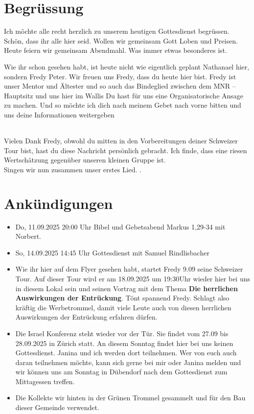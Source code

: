 \documentclass{../../inc/mybib}
\newenvironment{block}[1][]{%
  \vspace{1.5em}%
  \noindent\textbf{#1}\par%
  \vspace{0.0em}%
}{%
  \vspace{1em}%
}
\begin{document}
\section{Begrüssung}
Ich möchte alle recht herzlich zu unserem heutigen Gottesdienst begrüssen. Schön, dass ihr alle hier seid. Wollen wir gemeinsam Gott Loben und Preisen. Heute feiern wir gemeinsam Abendmahl. Was immer etwas besonderes ist. 
\begin{block}
Wie ihr schon gesehen habt, ist heute nicht wie eigentlich geplant Nathanael hier, sondern Fredy Peter. Wir freuen uns Fredy, dass du heute hier bist. Fredy ist unser Mentor und Ältester und so auch das Bindeglied zwischen dem MNR -- Hauptsitz und uns hier im Wallis Du hast für uns eine Organisatorische Ansage zu machen. Und so möchte ich dich nach meinem Gebet nach vorne bitten und uns deine Informationen weitergeben
\end{block}

\beten{}
\\

Vielen Dank Fredy, obwohl du mitten in den Vorbereitungen deiner Schweizer Tour bist, hast du diese Nachricht persönlich gebracht. Ich finde, dass eine riesen Wertschätzung gegenüber unseren kleinen Gruppe ist.\\

Singen wir nun zusammen unser erstes Lied.
{}.

\section{Ankündigungen}
\begin{itemize}
    \item {} Do, 11.09.2025 20:00 Uhr Bibel und Gebetsabend Markus 1,29-34 mit Norbert.
    \item {} So, 14.09.2025 14:45 Uhr Gottesdienst mit Samuel Rindlisbacher
    \item {} Wie ihr hier auf dem Flyer gesehen habt, startet Fredy 9.09 seine Schweizer Tour. Auf dieser Tour wird er am 18.09.2025 um 19:30Uhr wieder hier bei uns in diesem Lokal sein und seinen Vortrag mit dem Thema \textbf{Die herrlichen Auswirkungen der Entrückung}. Tönt spannend Fredy. Schlagt also kräftig die Werbetrommel, damit viele Leute auch von diesen herrlichen Auswirkungen der Entrückung erfahren dürfen.
    \item {} Die Israel Konferenz steht wieder vor der Tür. Sie findet vom 27.09 bis 28.09.2025 in Zürich statt. An diesem Sonntag findet hier bei uns keinen Gottesdienst. Janina und ich werden dort teilnehmen. Wer von euch auch daran teilnehmen möchte, kann sich gerne bei mir oder Janina melden und wir können uns am Sonntag in Dübendorf nach dem Gottesdienst zum Mittagessen treffen.
    \item Die Kollekte wir hinten in der Grünen Trommel gesammelt und für den Bau dieser Gemeinde verwendet.
\end{itemize}
\end{document}
